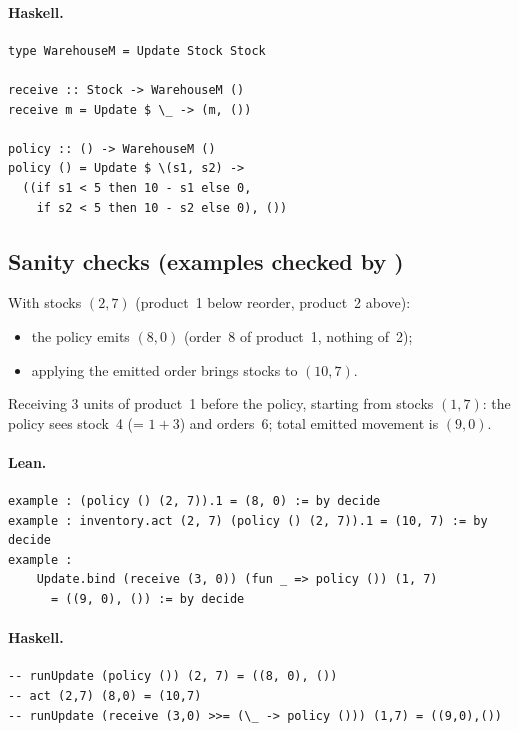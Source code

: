 \documentclass[11pt,a4paper]{article}
\begin{document}
\paragraph{Haskell.}
\begin{lstlisting}[style=haskell]
type WarehouseM = Update Stock Stock

receive :: Stock -> WarehouseM ()
receive m = Update $ \_ -> (m, ())

policy :: () -> WarehouseM ()
policy () = Update $ \(s1, s2) ->
  ((if s1 < 5 then 10 - s1 else 0,
    if s2 < 5 then 10 - s2 else 0), ())
\end{lstlisting}


\subsection{Sanity checks (examples checked by )}

\begin{prop}
With stocks $(2, 7)$ (product~1 below reorder, product~2 above):
\begin{itemize}
  \item the policy emits $(8, 0)$ (order~8 of product~1, nothing of~2);
  \item applying the emitted order brings stocks to $(10, 7)$.
\end{itemize}
\end{prop}

\begin{prop}
Receiving 3 units of product~1 before the policy, starting from stocks
$(1, 7)$: the policy sees stock~4 (= $1 + 3$) and orders~6; total emitted
movement is $(9, 0)$.
\end{prop}

\paragraph{Lean.}
\begin{lstlisting}[style=lean]
example : (policy () (2, 7)).1 = (8, 0) := by decide
example : inventory.act (2, 7) (policy () (2, 7)).1 = (10, 7) := by decide
example :
    Update.bind (receive (3, 0)) (fun _ => policy ()) (1, 7)
      = ((9, 0), ()) := by decide
\end{lstlisting}

\paragraph{Haskell.}
\begin{lstlisting}[style=haskell]
-- runUpdate (policy ()) (2, 7) = ((8, 0), ())
-- act (2,7) (8,0) = (10,7)
-- runUpdate (receive (3,0) >>= (\_ -> policy ())) (1,7) = ((9,0),())
\end{lstlisting}
\end{document}
